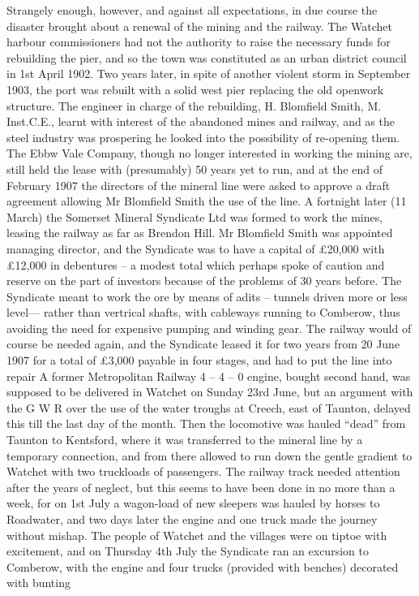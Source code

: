 \documentclass[10pt,a4paper]{article}
\begin{document}
  Strangely enough, however, and against all expectations, in due course the disaster brought about a renewal of the mining and the railway. The Watchet harbour commissioners had not the authority to raise the necessary funds for rebuilding the pier, and so the town was constituted as an urban district council in 1st April 1902. Two years later, in spite of another violent storm in September 1903, the port was rebuilt with a solid west pier replacing the old openwork structure.  The engineer in charge of the rebuilding, H. Blomfield Smith, M. Inst.C.E., learnt with interest of the abandoned mines and railway, and as the steel industry was prospering he looked into the possibility of re-opening them.  The Ebbw Vale Company, though no longer interested in working the mining are, still held the lease with (presumably) 50 years yet to run, and at the end of  February 1907 the directors of the mineral line were asked to approve a draft agreement allowing Mr Blomfield Smith the use of the line. A fortnight later (11 March) the Somerset Mineral Syndicate Ltd was formed to work the mines, leasing the railway as far as Brendon Hill. Mr Blomfield Smith was appointed managing director, and the Syndicate was to have a capital of £20,000 with £12,000 in debentures – a modest total which perhaps spoke of caution and reserve on the part of investors because of the problems of 30 years before.                                                                                                                                     
     The Syndicate meant to work the ore by means of adits – tunnels driven more or less level--- rather than vertrical shafts,  with cableways running to Comberow, thus avoiding the need for expensive pumping and winding gear. The railway would of course be needed again, and the Syndicate  leased it for two years from  20 June 1907 for a total of £3,000 payable in four stages, and had to put the line into repair  
      A former Metropolitan Railway 4 – 4 – 0 engine, bought second hand, was supposed to be delivered in Watchet on Sunday 23rd June, but an argument with the G W R over the use of the water troughs at Creech, east of Taunton, delayed this till the last day of the month. Then the locomotive was hauled “dead” from Taunton to Kentsford, where it was transferred to the mineral line by a temporary connection, and from there allowed to run down the gentle gradient to Watchet with two truckloads of passengers. The railway track needed attention after the years of neglect, but this seems to have been done in no more than a week, for on 1st July a wagon-load of new sleepers was hauled by horses to Roadwater, and two days later the engine and one truck made the journey without mishap. The people of Watchet and the villages were on tiptoe with excitement, and on Thursday 4th July the Syndicate ran an excursion to Comberow, with the engine and four trucks (provided with benches) decorated with bunting
\end{document}
